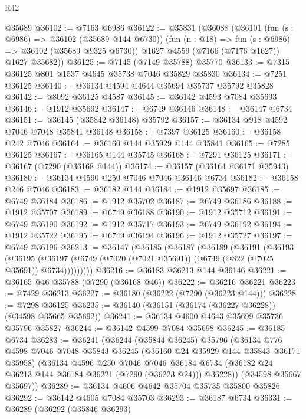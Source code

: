 \begin{lexlean}{R42}
\begin{coremodule}
{    @35689
@36102 := @7163 @6986
@36122 := @35831
    (@36088
      (@36101
        (fun (s : @6986) => @36102 (@35689 @144 @6730))
        (fun (n : @18) => fun (s : @6986) => @36102 (@35689 @9325 @6730))
        @1627
        @4559
        (@7166 (@7176 @1627))
        @1627
        @35682))
@36125 := @7145 (@7149 @35788) @35770
@36133 := @7315 @36125 @801 @1537 @4645 @35738 @7046 @35829 @35830
@36134 := @7251 @36125
@36140 := @36134 @4594 @4644 @35694 @35737 @35792 @35828
@36142 := @8092 @36125 @4587
@36145 := @36142 @4593 @7084 @35693
@36146 := @1912 @35692
@36147 := @6749 @36146
@36148 := @36147 @6734
@36151 := @36145 (@35842 @36148) @35792
@36157 := @36134 @918 @4592 @7046 @7048 @35841 @36148
@36158 := @7397 @36125
@36160 := @36158 @242 @7046
@36164 := @36160 @144 @35929 @144 @35841
@36165 := @7285 @36125
@36167 := @36165 @144 @35745
@36168 := @7291 @36125
@36171 := @36167 (@7290 (@36168 @144))
@36174 := @36157 (@36164 @36171 @35943)
@36180 := @36134 @4590 @250 @7046 @7046 @36146 @6734
@36182 := @36158 @246 @7046
@36183 := @36182 @144
@36184 := @1912 @35697
@36185 := @6749 @36184
@36186 := @1912 @35702
@36187 := @6749 @36186
@36188 := @1912 @35707
@36189 := @6749 @36188
@36190 := @1912 @35712
@36191 := @6749 @36190
@36192 := @1912 @35717
@36193 := @6749 @36192
@36194 := @1912 @35722
@36195 := @6749 @36194
@36196 := @1912 @35727
@36197 := @6749 @36196
@36213 := @36147
    (@36185
      (@36187
        (@36189
          (@36191
            (@36193
              (@36195
                (@36197 (@6749 (@7020 (@7021 @35691)) (@6749 (@822 (@7025 @35691)) @6734)))))))))
@36216 := @36183 @36213 @144 @36146
@36221 := @36165 @46 @35788 (@7290 (@36168 @46))
@36222 := @36216 @36221
@36223 := @7429 @36213
@36227 := @36180 (@36222 (@7290 (@36223 @144)))
@36228 := @7298 @36125
@36235 := @36140 (@36151 (@36174 (@36227 @36228)) (@34598 @35665 @35692))
@36241 := @36134 @4600 @4643 @35699 @35736 @35796 @35827
@36244 := @36142 @4599 @7084 @35698
@36245 := @36185 @6734
@36283 := @36241
    (@36244
      (@35844 @36245)
      @35796
      (@36134
        @776
        @4598
        @7046
        @7048
        @35843
        @36245
        (@36160 @24 @35929 @144 @35843 @36171 @35958)
        (@36134
          @4596
          @250
          @7046
          @7046
          @36184
          @6734
          (@36182 @24 @36213 @144 @36184 @36221 (@7290 (@36223 @24)))
          @36228))
      (@34598 @35667 @35697))
@36289 := @36134 @4606 @4642 @35704 @35735 @35800 @35826
@36292 := @36142 @4605 @7084 @35703
@36293 := @36187 @6734
@36331 := @36289
    (@36292
      (@35846 @36293)
}
\end{coremodule}
\end{lexlean}
